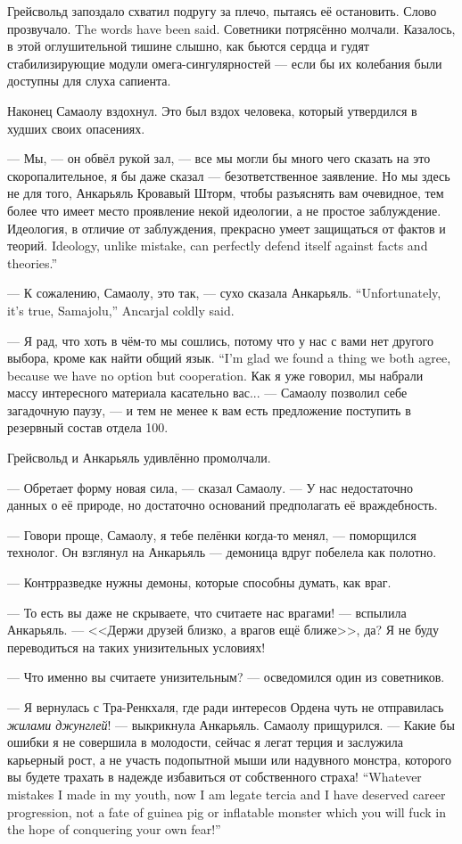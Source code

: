 Грейсвольд запоздало схватил подругу за плечо, пытаясь её остановить.
{Слово прозвучало.}
{The words have been said.}
Советники потрясённо молчали.
Казалось, в этой оглушительной тишине слышно, как бьются сердца и гудят стабилизирующие модули омега-сингулярностей --- если бы их колебания были доступны для слуха сапиента.

Наконец Самаолу вздохнул.
Это был вздох человека, который утвердился в худших своих опасениях.

--- Мы, --- он обвёл рукой зал, --- все мы могли бы много чего сказать на это скоропалительное, я бы даже сказал --- безответственное заявление.
Но мы здесь не для того, Анкарьяль Кровавый Шторм, чтобы разъяснять вам очевидное, тем более что имеет место проявление некой идеологии, а не простое заблуждение.
{Идеология, в отличие от заблуждения, прекрасно умеет защищаться от фактов и теорий.}
{Ideology, unlike mistake, can perfectly defend itself against facts and theories.''}

{--- К сожалению, Самаолу, это так, --- сухо сказала Анкарьяль.}
{``Unfortunately, it's true, Samajolu,'' Ancarjal coldly said.}

{--- Я рад, что хоть в чём-то мы сошлись, потому что у нас с вами нет другого выбора, кроме как найти общий язык.}
{``I'm glad we found a thing we both agree, because we have no option but cooperation.}
Как я уже говорил, мы набрали массу интересного материала касательно вас... --- Самаолу позволил себе загадочную паузу, --- и тем не менее к вам есть предложение поступить в резервный состав отдела 100.

Грейсвольд и Анкарьяль удивлённо промолчали.

--- Обретает форму новая сила, --- сказал Самаолу.
--- У нас недостаточно данных о её природе, но достаточно оснований предполагать её враждебность.

--- Говори проще, Самаолу, я тебе пелёнки когда-то менял, --- поморщился технолог.
Он взглянул на Анкарьяль --- демоница вдруг побелела как полотно.

--- Контрразведке нужны демоны, которые способны думать, как враг.

--- То есть вы даже не скрываете, что считаете нас врагами! --- вспылила Анкарьяль.
--- <<Держи друзей близко, а врагов ещё ближе>>, да?
Я не буду переводиться на таких унизительных условиях!

--- Что именно вы считаете унизительным? --- осведомился один из советников.

--- Я вернулась с Тра-Ренкхаля, где ради интересов Ордена чуть не отправилась \emph{жилами джунглей}! --- выкрикнула Анкарьяль.
Самаолу прищурился.
{--- Какие бы ошибки я не совершила в молодости, сейчас я легат терция и заслужила карьерный рост, а не участь подопытной мыши или надувного монстра, которого вы будете трахать в надежде избавиться от собственного страха!}
{``Whatever mistakes I made in my youth, now I am legate tercia and I have deserved career progression, not a fate of guinea pig or inflatable monster which you will fuck in the hope of conquering your own fear!''}

